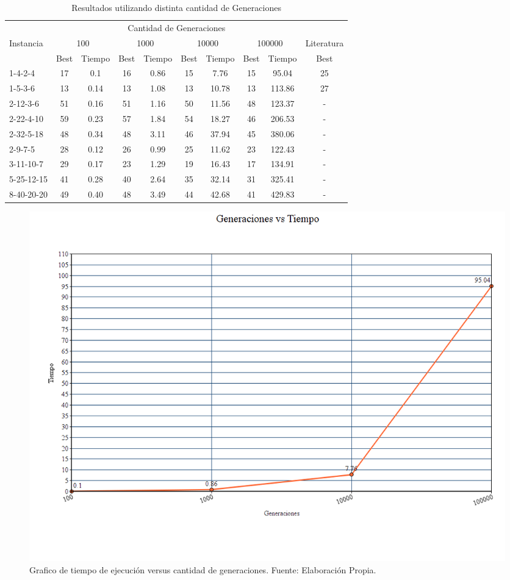 \documentclass[letter, 10pt]{article}
\begin{document}
\begin{table}[]
\centering
\begin{tabular}{l|ccccccccc}
    \hline
                &\multicolumn{8}{c}{Cantidad de Generaciones} & \\
   Instancia    &\multicolumn{2}{c}{100}&\multicolumn{2}{c}{1000}&\multicolumn{2}{c}{10000}&\multicolumn{2}{c}{100000}& Literatura \cite{bish2011planning}\\
                &Best   & Tiempo   &Best   & Tiempo   & Best  & Tiempo   &   Best    & Tiempo & Best\\

    \hline
    1-4-2-4     &  17   &   0.1  &   16  &   0.86  &  15   &   7.76  &  15   &   95.04  & 25\\
    1-5-3-6     &  13   &   0.14   &   13  &   1.08   &   13  &   10.78   &   13  &   113.86 & 27  \\
    2-12-3-6    &  51   &   0.16  &   51  &   1.16  &   50  &   11.56  &   48  &   123.37 & - \\
    2-22-4-10   &  59   &   0.23  &   57  &   1.84  &   54  &   18.27  &   46  &   206.53 & - \\ 
    2-32-5-18   &  48   &   0.34  &   48  &   3.11  &   46  &   37.94  &   45  &   380.06 & - \\
    2-9-7-5     &  28   &   0.12  &   26  &   0.99  &   25  &   11.62  &   23  &   122.43 & - \\
    3-11-10-7   &  29   &   0.17  &   23  &   1.29  &   19  &   16.43  &   17  &   134.91 & - \\
    5-25-12-15  &  41   &   0.28  &   40  &   2.64  &   35  &  32.14   &   31   &   325.41 & - \\
    8-40-20-20  &  49   &   0.40  &   48  &   3.49  &   44  &  42.68  &     41    &   429.83 & -
\end{tabular}
\caption{Resultados utilizando distinta cantidad de Generaciones}
\label{tab:generations}
\end{table}

\begin{figure}
\centering
\includegraphics[scale=0.3]{GenVsTiempo.png}
\caption{Grafico de tiempo de ejecución versus cantidad de generaciones. Fuente: Elaboración Propia.}
\label{fig:genvstime}
\end{figure}
\end{document}

